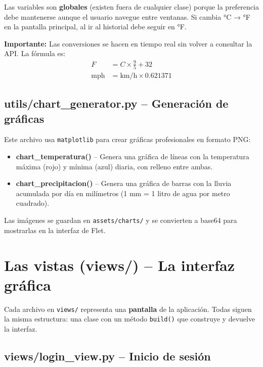 \documentclass[12pt,a4paper]{article}
\begin{document}
Las variables son \textbf{globales} (existen fuera de cualquier clase) porque la preferencia debe mantenerse aunque el usuario navegue entre ventanas. Si cambia °C → °F en la pantalla principal, al ir al historial debe seguir en °F.

\textbf{Importante:} Las conversiones se hacen en tiempo real sin volver a consultar la API. La fórmula es:
\begin{align*}
    F &= C \times \frac{9}{5} + 32\\
    \text{mph} &= \text{km/h} \times 0.621371
\end{align*}

\subsection{utils/chart\_generator.py -- Generación de gráficas}

Este archivo usa \texttt{matplotlib} para crear gráficas profesionales en formato PNG:

\begin{itemize}
    \item \textbf{chart\_temperatura()} -- Genera una gráfica de líneas con la temperatura máxima (rojo) y mínima (azul) diaria, con relleno entre ambas.
    \item \textbf{chart\_precipitacion()} -- Genera una gráfica de barras con la lluvia acumulada por día en milímetros (1 mm = 1 litro de agua por metro cuadrado).
\end{itemize}

Las imágenes se guardan en \texttt{assets/charts/} y se convierten a base64 para mostrarlas en la interfaz de Flet.

\section{Las vistas (views/) -- La interfaz gráfica}

Cada archivo en \texttt{views/} representa una \textbf{pantalla} de la aplicación. Todas siguen la misma estructura: una clase con un método \texttt{build()} que construye y devuelve la interfaz.

\subsection{views/login\_view.py -- Inicio de sesión}
\end{document}

